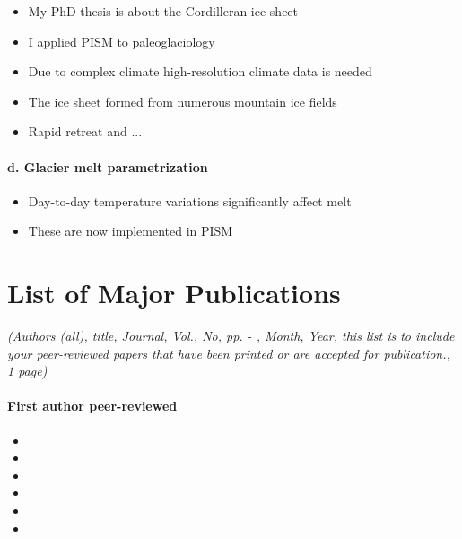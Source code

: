 \documentclass{article}
\begin{document}
    \begin{itemize}
      \item{My PhD thesis is about the Cordilleran ice sheet}
      \item{I applied PISM to paleoglaciology}
      \item{Due to complex climate high-resolution climate data is needed}
      \item{The ice sheet formed from numerous mountain ice fields}
      \item{Rapid retreat and ...}
    \end{itemize}

\paragraph{d. Glacier melt parametrization}

    \begin{itemize}
      \item{Day-to-day temperature variations significantly affect melt}
      \item{These are now implemented in PISM}
    \end{itemize}


\section{List of Major Publications}

    \emph{(Authors (all), title, Journal,  Vol., No, pp.   -   , Month, Year,
          this list is to include your peer-reviewed papers that have been printed or
          are accepted for publication., 1 page)}

\paragraph{First author peer-reviewed}

    

    \begin{itemize}
      \item{}
      \item{}
      \item{}
      \item{}
      \item{}
      \item{}
    \end{itemize}
\end{document}
